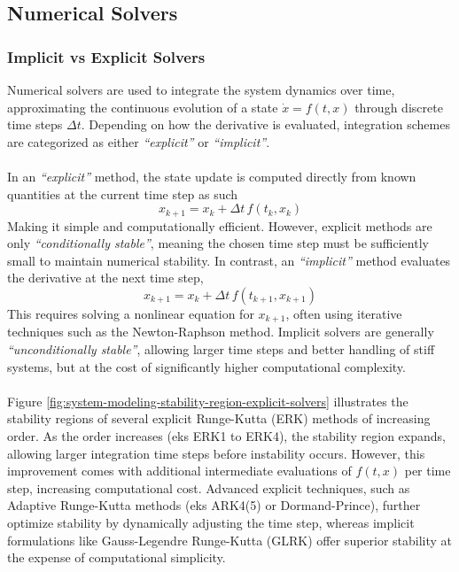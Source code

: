 \subsection{Numerical Solvers}
\subsubsection{Implicit vs Explicit Solvers}
Numerical solvers are used to integrate the system dynamics over time, approximating the continuous evolution of a state $\dot{x} = f(t, x)$ through discrete time steps $\Delta t$. Depending on how the derivative is evaluated, integration schemes are categorized as either \textit{``explicit''} or \textit{``implicit''}.  
\\ \\
In an \textit{``explicit''} method, the state update is computed directly from known quantities at the current time step as such
$$
    x_{k+1} = x_k + \Delta t \, f(t_k, x_k)
$$
Making it simple and computationally efficient. However, explicit methods are only \textit{``conditionally stable''}, meaning the chosen time step must be sufficiently small to maintain numerical stability. In contrast, an \textit{``implicit''} method evaluates the derivative at the next time step,
$$
    x_{k+1} = x_k + \Delta t \, f(t_{k+1}, x_{k+1})
$$
This requires solving a nonlinear equation for $x_{k+1}$, often using iterative techniques such as the Newton-Raphson method. Implicit solvers are generally \textit{``unconditionally stable''}, allowing larger time steps and better handling of stiff systems, but at the cost of significantly higher computational complexity.  
\\ \\
Figure \ref{fig:system-modeling-stability-region-explicit-solvers} illustrates the stability regions of several explicit Runge-Kutta (ERK) methods of increasing order. As the order increases (eks ERK1 to ERK4), the stability region expands, allowing larger integration time steps before instability occurs. However, this improvement comes with additional intermediate evaluations of $f(t, x)$ per time step, increasing computational cost. Advanced explicit techniques, such as Adaptive Runge-Kutta methods (eks ARK4(5) or Dormand-Prince), further optimize stability by dynamically adjusting the time step, whereas implicit formulations like Gauss-Legendre Runge-Kutta (GLRK) offer superior stability at the expense of computational simplicity.  

